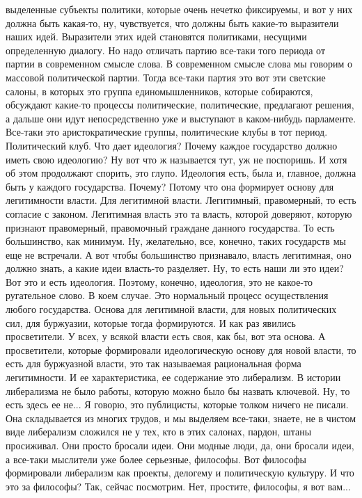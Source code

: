 выделенные субъекты политики, которые очень нечетко фиксируемы, и вот у них
должна быть какая-то, ну, чувствуется, что должны быть какие-то выразители наших
идей. Выразители этих идей становятся политиками, несущими определенную диалогу.
Но надо отличать партию все-таки того периода от партии в современном смысле
слова. В современном смысле слова мы говорим о массовой политической партии.
Тогда все-таки партия это вот эти светские салоны, в которых это группа
единомышленников, которые собираются, обсуждают какие-то процессы политические,
политические, предлагают решения, а дальше они идут непосредственно уже и
выступают в каком-нибудь парламенте. Все-таки это аристократические группы,
политические клубы в тот период. Политический клуб. Что дает идеология? Почему
каждое государство должно иметь свою идеологию? Ну вот что ж называется тут, уж
не поспоришь. И хотя об этом продолжают спорить, это глупо. Идеология есть, была
и, главное, должна быть у каждого государства. Почему? Потому что она формирует
основу для легитимности власти. Для легитимной власти. Легитимный, правомерный,
то есть согласие с законом. Легитимная власть это та власть, которой доверяют,
которую признают правомерный, правомочный граждане данного государства. То есть
большинство, как минимум. Ну, желательно, все, конечно, таких государств мы еще
не встречали. А вот чтобы большинство признавало, власть легитимная, оно должно
знать, а какие идеи власть-то разделяет. Ну, то есть наши ли это идеи? Вот это и
есть идеология. Поэтому, конечно, идеология, это не какое-то ругательное слово.
В коем случае. Это нормальный процесс осуществления любого государства. Основа
для легитимной власти, для новых политических сил, для буржуазии, которые тогда
формируются. И как раз явились просветители. У всех, у всякой власти есть своя,
как бы, вот эта основа. А просветители, которые формировали идеологическую
основу для новой власти, то есть для буржуазной власти, это так называемая
рациональная форма легитимности. И ее характеристика, ее содержание это
либерализм. В истории либерализма не было работы, которую можно было бы назвать
ключевой. Ну, то есть здесь ее не... Я говорю, это публицисты, которые толком
ничего не писали. Она складывается из многих трудов, и мы выделяем все-таки,
знаете, не в чистом виде либерализм сложился не у тех, кто в этих салонах,
пардон, штаны просиживал. Они просто бросали идеи. Они модные люди, да, они
бросали идеи, а все-таки мыслители уже более серьезные, философы. Вот философы
формировали либерализм как проекты, делогему и политическую культуру. И что это
за философы? Так, сейчас посмотрим. Нет, простите, философы, я вот вам...
